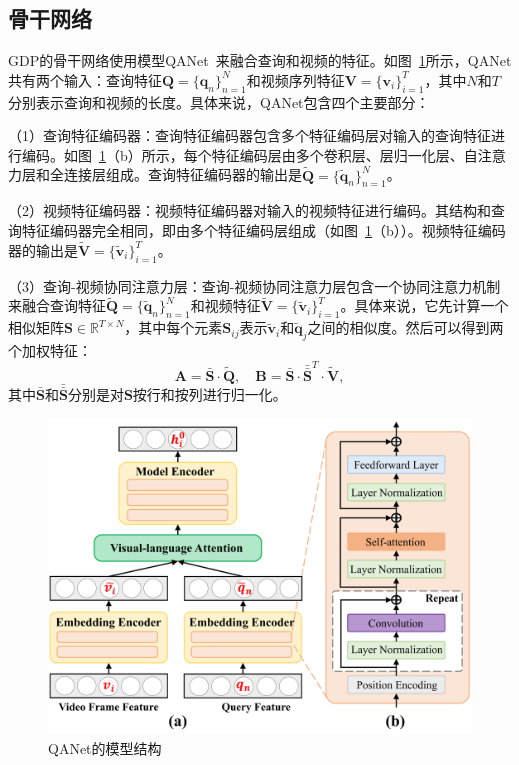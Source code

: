 \subsection{骨干网络}
GDP的骨干网络使用模型QANet~\cite{yu2018qanet}来融合查询和视频的特征。如图~\ref{ch6:fig:qanet}所示，QANet共有两个输入：查询特征$\bm{Q} = \{\bm{q}_n\}^N_{n=1}$和视频序列特征$\bm{V}=\{\bm{v}_i\}^T_{i=1}$，其中$N$和$T$分别表示查询和视频的长度。具体来说，QANet包含四个主要部分：

（1）查询特征编码器：查询特征编码器包含多个特征编码层对输入的查询特征进行编码。如图~\ref{ch6:fig:qanet}（b）所示，每个特征编码层由多个卷积层、层归一化层、自注意力层和全连接层组成。查询特征编码器的输出是$\bm{\tilde{Q}}=\{\bm{\tilde{q}}_n\}^N_{n=1}$。

（2）视频特征编码器：视频特征编码器对输入的视频特征进行编码。其结构和查询特征编码器完全相同，即由多个特征编码层组成（如图~\ref{ch6:fig:qanet}（b））。视频特征编码器的输出是$\bm{\tilde{V}} = \{\bm{\tilde{v}}_i\}^T_{i=1}$。

（3）查询-视频协同注意力层：查询-视频协同注意力层包含一个协同注意力机制来融合查询特征$\bm{\tilde{Q}}=\{\bm{\tilde{q}}_n\}^N_{n=1}$和视频特征$\bm{\tilde{V}} = \{\bm{\tilde{v}}_i\}^T_{i=1}$。具体来说，它先计算一个相似矩阵$\bm{S}\in\mathbb{R}^{T\times N}$，其中每个元素$\bm{S}_{ij}$表示$\bm{\tilde{v}}_i$和$\bm{\tilde{q}}_j$之间的相似度。然后可以得到两个加权特征：
\begin{equation}
  \bm{A} = \bar{\bm{S}} \cdot \tilde{\bm{Q}}, \quad \bm{B} = \bar{\bm{S}} \cdot \bar{\bar{\bm{S}}}^T \cdot \tilde{\bm{V}},
\end{equation}
其中$\bar{\bm{S}}$和$\bar{\bar{\bm{S}}}$分别是对$\bm{S}$按行和按列进行归一化。

\begin{figure}[t]
    \centering
    \includegraphics[width=0.8\linewidth]{chapter6/res/qanet.pdf}
    \caption{QANet的模型结构}
    \label{ch6:fig:qanet}
\end{figure}

